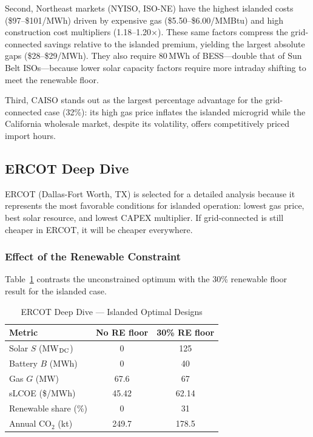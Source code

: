 \documentclass[conference]{IEEEtran}
\begin{document}
Second, Northeast markets (NYISO, ISO-NE) have the highest islanded costs
(\$97--\$101/MWh) driven by expensive gas (\$5.50--\$6.00/MMBtu) and high
construction cost multipliers (1.18--1.20$\times$).
These same factors compress the grid-connected savings relative to the
islanded premium, yielding the largest absolute gaps (\$28--\$29/MWh).
They also require 80\,MWh of BESS---double that of Sun Belt ISOs---because
lower solar capacity factors require more intraday shifting to meet the
renewable floor.

Third, CAISO stands out as the largest percentage advantage for the
grid-connected case (32\%): its high gas price inflates the islanded
microgrid while the California wholesale market, despite its volatility,
offers competitively priced import hours.

\subsection{ERCOT Deep Dive}

ERCOT (Dallas-Fort Worth, TX) is selected for a detailed analysis because it
represents the most favorable conditions for islanded operation: lowest gas
price, best solar resource, and lowest CAPEX multiplier.
If grid-connected is still cheaper in ERCOT, it will be cheaper everywhere.

\subsubsection{Effect of the Renewable Constraint}

Table~\ref{tab:ercot} contrasts the unconstrained optimum with the 30\%
renewable floor result for the islanded case.

\begin{table}[htbp]
\caption{ERCOT Deep Dive --- Islanded Optimal Designs}
\label{tab:ercot}
\begin{center}
\begin{tabular}{|l|c|c|}
\hline
\textbf{Metric} & \textbf{No RE floor} & \textbf{30\% RE floor} \\
\hline
Solar $S$ (MW$_{\rm DC}$)  & 0     & 125  \\
\hline
Battery $B$ (MWh)           & 0     & 40   \\
\hline
Gas $G$ (MW)                & 67.6  & 67   \\
\hline
sLCOE (\$/MWh)              & 45.42 & 62.14 \\
\hline
Renewable share (\%)        & 0     & 31   \\
\hline
Annual CO$_2$ (kt)          & 249.7 & 178.5 \\
\hline
\end{tabular}
\end{center}
\end{table}
\end{document}
